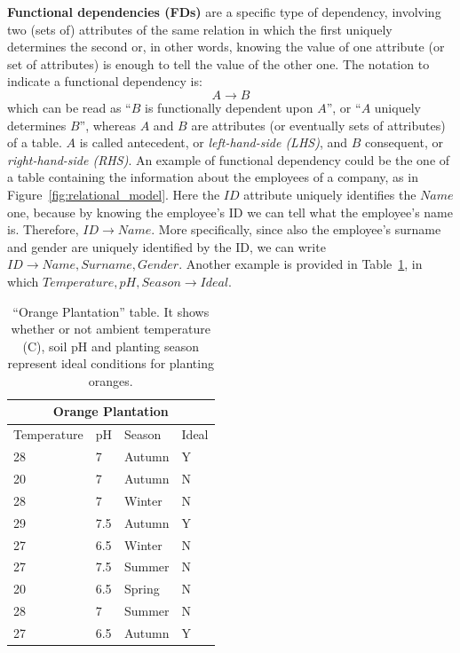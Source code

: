 \textbf{Functional dependencies (FDs)} are a specific type of dependency, involving two (sets of) attributes of the same relation in which the first uniquely determines the second or, in other words, knowing the value of one attribute (or set of attributes) is enough to tell the value of the other one. The notation to indicate a functional dependency is: \[A \rightarrow B\] which can be read as ``\(B\) is functionally dependent upon \(A\)'', or ``\(A\) uniquely determines \(B\)'', whereas \(A\) and \(B\) are attributes (or eventually sets of attributes) of a table. \(A\) is called antecedent, or \textit{left-hand-side (LHS)}, and \(B\) consequent, or \textit{right-hand-side (RHS)}. An example of functional dependency could be the one of a table containing the information about the employees of a company, as in Figure~\ref{fig:relational_model}. Here the \(\mathit{ID}\) attribute uniquely identifies the \(\mathit{Name}\) one, because by knowing the employee's ID we can tell what the employee's name is. Therefore, \(\mathit{ID} \rightarrow \mathit{Name}\). More specifically, since also the employee's surname and gender are uniquely identified by the ID, we can write \(\mathit{ID} \rightarrow \mathit{Name}, \mathit{Surname}, \mathit{Gender}\). Another example is provided in Table~\ref{table:orange_plantation}, in which \(\mathit{Temperature}, \mathit{pH}, \mathit{Season} \rightarrow \mathit{Ideal}\).

\begin{table}
\begin{tabular}{|p{2.5cm}|p{2.5cm}|p{2.5cm}|p{2.5cm}|}
\hline
\multicolumn{4}{|c|}{Orange Plantation}\\
\hline
Temperature & pH & Season & Ideal\\
\hline
28 & 7 & Autumn & Y\\
20 & 7 & Autumn & N\\
28 & 7 & Winter & N\\
29 & 7.5 & Autumn & Y\\
27 & 6.5 & Winter & N\\
27 & 7.5 & Summer & N\\
20 & 6.5 & Spring & N\\
28 & 7 & Summer & N\\
27 & 6.5 & Autumn & Y\\
\hline
\end{tabular}
\centering
\caption{``Orange Plantation'' table. It shows whether or not ambient temperature (\textdegree C), soil pH and planting season represent ideal conditions for planting oranges.}
\label{table:orange_plantation}
\end{table}

